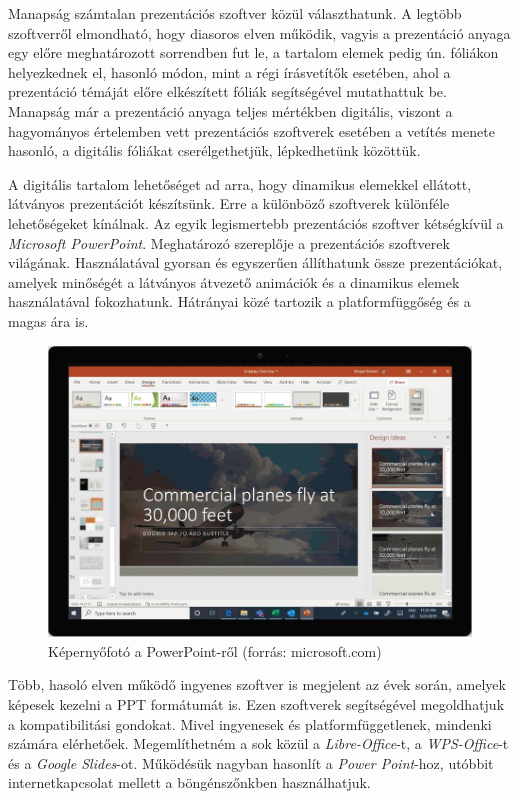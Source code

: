 Manapság számtalan prezentációs szoftver közül választhatunk. A legtöbb szoftverről elmondható, hogy diasoros elven működik, vagyis a prezentáció anyaga egy előre meghatározott sorrendben fut le, a tartalom elemek pedig ún. fóliákon helyezkednek el, hasonló módon, mint a régi írásvetítők esetében, ahol a prezentáció témáját előre elkészített fóliák segítségével mutathattuk be. Manapság már a prezentáció anyaga teljes mértékben digitális, viszont a hagyományos értelemben vett prezentációs szoftverek esetében a vetítés menete hasonló, a digitális fóliákat cserélgethetjük, lépkedhetünk közöttük.

A digitális tartalom lehetőséget ad arra, hogy dinamikus elemekkel ellátott, látványos prezentációt készítsünk. Erre a különböző szoftverek különféle lehetőségeket kínálnak.
Az egyik legismertebb prezentációs szoftver kétségkívül a \textit{Microsoft PowerPoint}. Meghatározó szereplője a prezentációs szoftverek világának. Használatával gyorsan és egyszerűen állíthatunk össze prezentációkat, amelyek minőségét a látványos átvezető animációk és a dinamikus elemek használatával fokozhatunk. Hátrányai közé tartozik a platformfüggőség és a magas ára is.

\begin{figure}[h]
\centering
\includegraphics[width=8.97truecm, height=6.17truecm]{images/PowerPoint.png}
\caption{Képernyőfotó a PowerPoint-ről (forrás: microsoft.com)}
\label{fig:ppt}
\end{figure}

Több, hasoló elven működő ingyenes szoftver is megjelent az évek során, amelyek képesek kezelni a PPT formátumát is. Ezen szoftverek segítségével megoldhatjuk a kompatibilitási gondokat. Mivel ingyenesek és platformfüggetlenek, mindenki számára elérhetőek. Megemlíthetném a sok közül a \textit{Libre-Office}-t, a \textit{WPS-Office}-t és a \textit{Google Slides}-ot. Működésük nagyban hasonlít a \textit{Power Point}-hoz, utóbbit internetkapcsolat mellett a böngénszőnkben használhatjuk.

